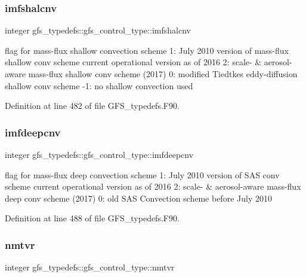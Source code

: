 \subsubsection{imfshalcnv}
{\footnotesize\ttfamily integer gfs\+\_\+typedefs\+::gfs\+\_\+control\+\_\+type\+::imfshalcnv}



flag for mass-\/flux shallow convection scheme 1\+: July 2010 version of mass-\/flux shallow conv scheme current operational version as of 2016 2\+: scale-\/ \& aerosol-\/aware mass-\/flux shallow conv scheme (2017) 0\+: modified Tiedtke\textquotesingle{}s eddy-\/diffusion shallow conv scheme -\/1\+: no shallow convection used 



Definition at line 482 of file G\+F\+S\+\_\+typedefs.\+F90.

\mbox{\label{structgfs__typedefs_1_1gfs__control__type_aaae0971de18573e233fb5e985d41ee00}} 
\subsubsection{imfdeepcnv}
{\footnotesize\ttfamily integer gfs\+\_\+typedefs\+::gfs\+\_\+control\+\_\+type\+::imfdeepcnv}



flag for mass-\/flux deep convection scheme 1\+: July 2010 version of S\+AS conv scheme current operational version as of 2016 2\+: scale-\/ \& aerosol-\/aware mass-\/flux deep conv scheme (2017) 0\+: old S\+AS Convection scheme before July 2010 



Definition at line 488 of file G\+F\+S\+\_\+typedefs.\+F90.

\mbox{\label{structgfs__typedefs_1_1gfs__control__type_a80f29963869a69996bb8ca55e1cc445e}} 
\subsubsection{nmtvr}
{\footnotesize\ttfamily integer gfs\+\_\+typedefs\+::gfs\+\_\+control\+\_\+type\+::nmtvr}



